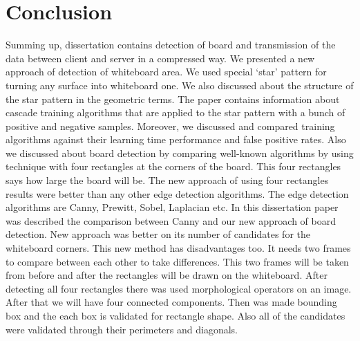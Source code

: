 \chapter*{Conclusion}

Summing up, dissertation contains detection of board and transmission of the data between client and server in a compressed way. We presented a new approach of detection of whiteboard area. We used special ‘star’ pattern for turning any surface into whiteboard one. We also discussed about the structure of the star pattern in the geometric terms. The paper contains information about cascade training algorithms that are applied to the star pattern with a bunch of positive and negative samples. Moreover, we discussed and compared training algorithms against their learning time performance and false positive rates. Also we discussed about board detection by comparing well-known algorithms by using technique with four rectangles at the corners of the board. This four rectangles says how large the board will be. The new approach of using four rectangles results were better than any other edge detection algorithms. The edge detection algorithms are Canny, Prewitt, Sobel, Laplacian etc. In this dissertation paper was described the comparison between Canny and our new approach of board detection. New approach was better on its number of candidates for the whiteboard corners. This new method has disadvantages too. It needs two frames to compare between each other to take differences. This two frames will be taken from before and after the rectangles will be drawn on the whiteboard. After detecting all four rectangles there was used morphological operators on an image. After that we will have four connected components. Then was made bounding box and the each box is validated for rectangle shape. Also all of the candidates were validated through their perimeters and diagonals.

